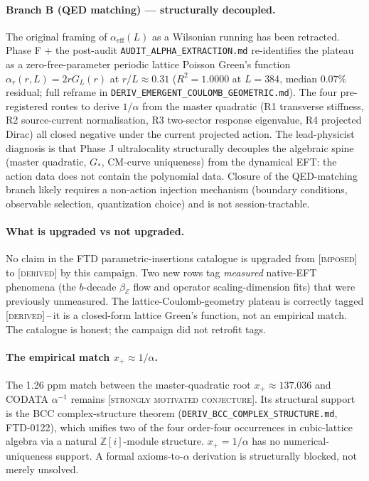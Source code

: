 \documentclass[11pt,letterpaper]{article}
\newcommand{\Gstar}{G_{\!*}}
\begin{document}
\paragraph{Branch B (QED matching) --- structurally decoupled.}
The original framing of $\alpha_{\mathrm{eff}}(L)$ as a Wilsonian
running has been retracted. Phase F + the post-audit
\texttt{AUDIT\_ALPHA\_EXTRACTION.md} re-identifies the plateau as a
zero-free-parameter periodic lattice Poisson Green's function
$\alpha_r(r, L) = 2 r G_L(r)$ at $r/L \approx 0.31$
($R^2 = 1.0000$ at $L = 384$, median $0.07\%$ residual; full reframe
in \texttt{DERIV\_EMERGENT\_COULOMB\_GEOMETRIC.md}). The four
pre-registered routes to derive $1/\alpha$ from the master quadratic
(R1 transverse stiffness, R2 source-current normalisation, R3
two-sector response eigenvalue, R4 projected Dirac) all closed
negative under the current projected action. The lead-physicist
diagnosis is that Phase J ultralocality structurally decouples the
algebraic spine (master quadratic, $\Gstar$, CM-curve uniqueness)
from the dynamical EFT: the action data does not contain the
polynomial data. Closure of the QED-matching branch likely requires a
non-action injection mechanism (boundary conditions, observable
selection, quantization choice) and is not session-tractable.

\paragraph{What is upgraded vs not upgraded.}
No claim in the FTD parametric-insertions catalogue is upgraded from
[\textsc{imposed}] to [\textsc{derived}] by this campaign. Two new
rows tag \emph{measured} native-EFT phenomena (the $b$-decade
$\beta_{\mathcal{E}}$ flow and operator scaling-dimension fits) that
were previously unmeasured. The lattice-Coulomb-geometry plateau is
correctly tagged [\textsc{derived}]\,--\,it is a closed-form lattice
Green's function, not an empirical match. The catalogue is honest;
the campaign did not retrofit tags.

\paragraph{The empirical match $x_+ \approx 1/\alpha$.}
The 1.26 ppm match between the master-quadratic root $x_+ \approx
137.036$ and CODATA $\alpha^{-1}$ remains [\textsc{strongly motivated
conjecture}]. Its structural support is the BCC complex-structure theorem
(\texttt{DERIV\_BCC\_COMPLEX\_STRUCTURE.md}, FTD-0122), which unifies
two of the four order-four occurrences in cubic-lattice algebra via a
natural $\mathbb{Z}[i]$-module structure. $x_+ = 1/\alpha$ has no
numerical-uniqueness support. A
formal axioms-to-$\alpha$ derivation is structurally blocked, not
merely unsolved.
\end{document}
